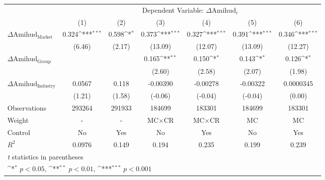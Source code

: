 {
\def\sym#1{\ifmmode^{#1}\else\(^{#1}\)\fi}
\begin{tabular}{l*{6}{c}}
\hline\hline
                    &\multicolumn{6}{c}{Dependent Variable: $\Delta \text{Amihud}_{i} $ }                                                               \\\cmidrule(lr){2-7}
                    &\multicolumn{1}{c}{(1)}         &\multicolumn{1}{c}{(2)}         &\multicolumn{1}{c}{(3)}         &\multicolumn{1}{c}{(4)}         &\multicolumn{1}{c}{(5)}         &\multicolumn{1}{c}{(6)}         \\
\hline
 $ \Delta \text{Amihud}_{\text{Market}} $ &       0.324\sym{***}&       0.598\sym{*}  &       0.373\sym{***}&       0.327\sym{***}&       0.391\sym{***}&       0.346\sym{***}\\
                    &      (6.46)         &      (2.17)         &     (13.09)         &     (12.07)         &     (13.09)         &     (12.27)         \\
[1em]
 $ \Delta \text{Amihud}_{\text{Group}} $ &                     &                     &       0.165\sym{**} &       0.150\sym{*}  &       0.143\sym{*}  &       0.126\sym{*}  \\
                    &                     &                     &      (2.60)         &      (2.58)         &      (2.07)         &      (1.98)         \\
[1em]
 $ \Delta \text{Amihud}_{\text{Industry}} $ &      0.0567         &       0.118         &    -0.00390         &    -0.00278         &    -0.00322         &   0.0000345         \\
                    &      (1.21)         &      (1.58)         &     (-0.06)         &     (-0.04)         &     (-0.04)         &      (0.00)         \\
\hline
Observations        &      293264         &      291933         &      184699         &      183301         &      184699         &      183301         \\
Weight              &           -         &           -         & $ \text{MC} \times \text{CR} $          & $ \text{MC} \times \text{CR} $          & $ \text{MC} $          & $ \text{MC} $          \\
Control             &          No         &         Yes         &          No         &         Yes         &          No         &         Yes         \\
$ R^2 $             &      0.0976         &       0.149         &       0.194         &       0.235         &       0.199         &       0.239         \\
\hline\hline
\multicolumn{7}{l}{\footnotesize \textit{t} statistics in parentheses}\\
\multicolumn{7}{l}{\footnotesize \sym{*} \(p<0.05\), \sym{**} \(p<0.01\), \sym{***} \(p<0.001\)}\\
\end{tabular}
}

